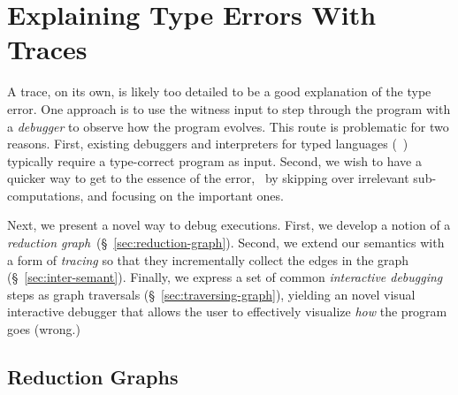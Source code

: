 \section{Explaining Type Errors With Traces}
\label{sec:explaining}

A trace, on its own, is likely too detailed to be
a good explanation of the type error. One approach
is to use the witness input to step through the
program with a \emph{debugger} to observe how
the program evolves.
%
This route is problematic for two reasons.
%
First, existing debuggers and interpreters for
typed languages (\eg\ \ocaml) typically require
a type-correct program as input.
%
Second, we wish to have a quicker way to get
to the essence of the error, \eg\ by skipping
over irrelevant sub-computations, and focusing
on the important ones.

Next, we present a novel way to debug executions.
%
First, we develop a notion of a
\emph{reduction graph}~(\S~\ref{sec:reduction-graph}).
%
Second, we extend our semantics with a form of \emph{tracing}
so that they incrementally collect the edges in the graph
(\S~\ref{sec:inter-semant}).
%
Finally, we express a set of common \emph{interactive debugging}
steps as graph traversals (\S~\ref{sec:traversing-graph}), yielding
an novel visual interactive debugger that allows the user
to effectively visualize \emph{how} the program goes (wrong.)


\subsection{Reduction Graphs}

